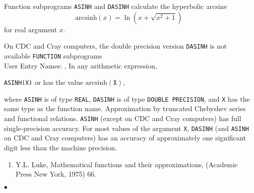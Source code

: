                           
                   
\Submitter{}                              
                        
Function subprograms {\tt ASINH} and {\tt DASINH} calculate
the hyperbolic arcsine
$$ \mathrm{arcsinh}(x) = \ln (x+\sqrt{x^2 +1})$$
for real argument $x$.
\par
On CDC and Cray computers, the double precision version
{\tt DASINH} is not available
\Structure
{\tt FUNCTION} subprograms\\
User Entry Names: , 
\Usage
In any arithmetic expression,
\begin{center}
{\tt ASINH(X)} \quad or  \quad has the value
\quad $\mathrm{arcsinh}(\mathtt{X})$,
\end{center}
where {\tt ASINH} is of type {\tt REAL},
{\tt DASINH} is of type {\tt DOUBLE
PRECISION}, and {\tt X} has the same type as the function name.
\Method
Approximation by truncated Chebyshev series and functional relations.
\Accuracy
{\tt ASINH} (except on CDC and Cray computers)
has full single-precision accuracy. For most values of the argument
{\tt X}, {\tt DASINH} (and {\tt ASINH} on CDC and Cray
computers) has an accuracy of approximately one significant
digit less than the machine precision.
\Refer
\begin{enumerate}
\item Y.L. Luke, Mathematical functions and their
approximations, (Academic Press New York, 1975) 66.
\end{enumerate}
$\bullet$
